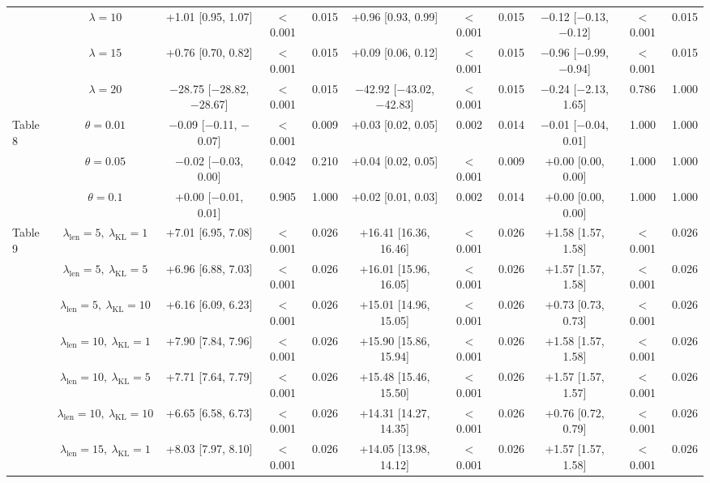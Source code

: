 \documentclass[10pt,letterpaper]{article}
\begin{document}
\begin{table}[!htb]
{\begin{tabular}{lcccccccccc}
 & $\lambda=10$ & +1.01 [0.95, 1.07] & $<$0.001 & 0.015 & +0.96 [0.93, 0.99] & $<$0.001 & 0.015 & $-$0.12 [$-$0.13, $-$0.12] & $<$0.001 & 0.015 \\
 & $\lambda=15$ & +0.76 [0.70, 0.82] & $<$0.001 & 0.015 & +0.09 [0.06, 0.12] & $<$0.001 & 0.015 & $-$0.96 [$-$0.99, $-$0.94] & $<$0.001 & 0.015 \\
 & $\lambda=20$ & $-$28.75 [$-$28.82, $-$28.67] & $<$0.001 & 0.015 & $-$42.92 [$-$43.02, $-$42.83] & $<$0.001 & 0.015 & $-$0.24 [$-$2.13, 1.65] & 0.786 & 1.000 \\
\midrule
Table 8 & $\theta=0.01$ & $-$0.09 [$-$0.11, $-$0.07] & $<$0.001 & 0.009 & +0.03 [0.02, 0.05] & 0.002 & 0.014 & $-$0.01 [$-$0.04, 0.01] & 1.000 & 1.000 \\
 & $\theta=0.05$ & $-$0.02 [$-$0.03, 0.00] & 0.042 & 0.210 & +0.04 [0.02, 0.05] & $<$0.001 & 0.009 & +0.00 [0.00, 0.00] & 1.000 & 1.000 \\
 & $\theta=0.1$ & +0.00 [$-$0.01, 0.01] & 0.905 & 1.000 & +0.02 [0.01, 0.03] & 0.002 & 0.014 & +0.00 [0.00, 0.00] & 1.000 & 1.000 \\
\midrule
Table 9 & $\lambda_{\mathrm{len}}=5,\ \lambda_{\mathrm{KL}}=1$ & +7.01 [6.95, 7.08] & $<$0.001 & 0.026 & +16.41 [16.36, 16.46] & $<$0.001 & 0.026 & +1.58 [1.57, 1.58] & $<$0.001 & 0.026 \\
 & $\lambda_{\mathrm{len}}=5,\ \lambda_{\mathrm{KL}}=5$ & +6.96 [6.88, 7.03] & $<$0.001 & 0.026 & +16.01 [15.96, 16.05] & $<$0.001 & 0.026 & +1.57 [1.57, 1.58] & $<$0.001 & 0.026 \\
 & $\lambda_{\mathrm{len}}=5,\ \lambda_{\mathrm{KL}}=10$ & +6.16 [6.09, 6.23] & $<$0.001 & 0.026 & +15.01 [14.96, 15.05] & $<$0.001 & 0.026 & +0.73 [0.73, 0.73] & $<$0.001 & 0.026 \\
 & $\lambda_{\mathrm{len}}=10,\ \lambda_{\mathrm{KL}}=1$ & +7.90 [7.84, 7.96] & $<$0.001 & 0.026 & +15.90 [15.86, 15.94] & $<$0.001 & 0.026 & +1.58 [1.57, 1.58] & $<$0.001 & 0.026 \\
 & $\lambda_{\mathrm{len}}=10,\ \lambda_{\mathrm{KL}}=5$ & +7.71 [7.64, 7.79] & $<$0.001 & 0.026 & +15.48 [15.46, 15.50] & $<$0.001 & 0.026 & +1.57 [1.57, 1.57] & $<$0.001 & 0.026 \\
 & $\lambda_{\mathrm{len}}=10,\ \lambda_{\mathrm{KL}}=10$ & +6.65 [6.58, 6.73] & $<$0.001 & 0.026 & +14.31 [14.27, 14.35] & $<$0.001 & 0.026 & +0.76 [0.72, 0.79] & $<$0.001 & 0.026 \\
 & $\lambda_{\mathrm{len}}=15,\ \lambda_{\mathrm{KL}}=1$ & +8.03 [7.97, 8.10] & $<$0.001 & 0.026 & +14.05 [13.98, 14.12] & $<$0.001 & 0.026 & +1.57 [1.57, 1.58] & $<$0.001 & 0.026 \\

\end{tabular}}
\end{table}
\end{document}
